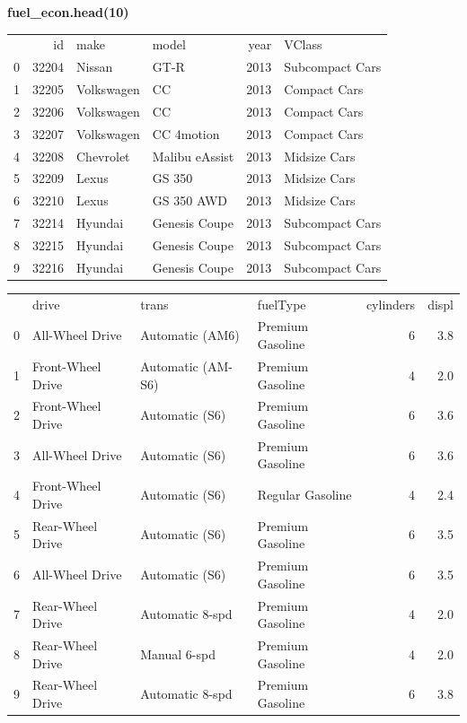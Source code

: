 \textbf{fuel\_econ.head(10)}
\begin{center}
	\begin{tabular}{lrllrl}
		{} &     id &        make &           model &  year &           VClass \\
		0 &  32204 &      Nissan &            GT-R &  2013 &  Subcompact Cars \\
		1 &  32205 &  Volkswagen &              CC &  2013 &     Compact Cars \\
		2 &  32206 &  Volkswagen &              CC &  2013 &     Compact Cars \\
		3 &  32207 &  Volkswagen &      CC 4motion &  2013 &     Compact Cars \\
		4 &  32208 &   Chevrolet &  Malibu eAssist &  2013 &     Midsize Cars \\
		5 &  32209 &       Lexus &          GS 350 &  2013 &     Midsize Cars \\
		6 &  32210 &       Lexus &      GS 350 AWD &  2013 &     Midsize Cars \\
		7 &  32214 &     Hyundai &   Genesis Coupe &  2013 &  Subcompact Cars \\
		8 &  32215 &     Hyundai &   Genesis Coupe &  2013 &  Subcompact Cars \\
		9 &  32216 &     Hyundai &   Genesis Coupe &  2013 &  Subcompact Cars \\
	\end{tabular}
	
\end{center}
\begin{tabular}{llllrr}
	{} &              drive &              trans &          fuelType &  cylinders &  displ \\
	0 &    All-Wheel Drive &    Automatic (AM6) &  Premium Gasoline &          6 &    3.8 \\
	1 &  Front-Wheel Drive &  Automatic (AM-S6) &  Premium Gasoline &          4 &    2.0 \\
	2 &  Front-Wheel Drive &     Automatic (S6) &  Premium Gasoline &          6 &    3.6 \\
	3 &    All-Wheel Drive &     Automatic (S6) &  Premium Gasoline &          6 &    3.6 \\
	4 &  Front-Wheel Drive &     Automatic (S6) &  Regular Gasoline &          4 &    2.4 \\
	5 &   Rear-Wheel Drive &     Automatic (S6) &  Premium Gasoline &          6 &    3.5 \\
	6 &    All-Wheel Drive &     Automatic (S6) &  Premium Gasoline &          6 &    3.5 \\
	7 &   Rear-Wheel Drive &    Automatic 8-spd &  Premium Gasoline &          4 &    2.0 \\
	8 &   Rear-Wheel Drive &       Manual 6-spd &  Premium Gasoline &          4 &    2.0 \\
	9 &   Rear-Wheel Drive &    Automatic 8-spd &  Premium Gasoline &          6 &    3.8 \\
\end{tabular}

